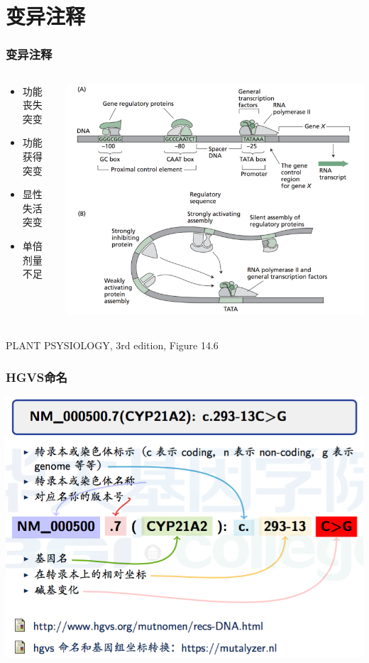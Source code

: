 \documentclass[12pt]{beamer}
\begin{document}
\section{变异注释}
\begin{frame}\frametitle{变异注释}
  \begin{columns}
    \begin{column}{0.35\textwidth}
\begin{itemize}
  \item 功能丧失突变
  \item 功能获得突变
  \item 显性失活突变
  \item 单倍剂量不足
\end{itemize}
    \end{column}
    \begin{column}{0.7\textwidth}
      \includegraphics[width=\textwidth]{figures/func.png}  
    \end{column}
  \end{columns}
  PLANT PSYSIOLOGY, 3rd edition, Figure 14.6
\end{frame}
\begin{frame}\frametitle{HGVS命名}
    \includegraphics[width=\textwidth]{figures/old_slides/hgvs.png}  
  \end{frame}
\end{document}
